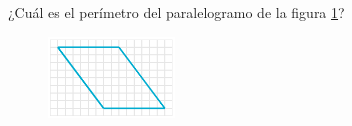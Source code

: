 ¿Cuál es el perímetro del paralelogramo de la figura \ref{fig:peri_paralelogramo_02}?
\begin{figure}[H]
    \begin{center}
        \includegraphics[width=0.3\textwidth]{../images/peri_paralelogramo_02.png}
    \end{center}
    \caption{}
    \label{fig:peri_paralelogramo_02}
\end{figure}